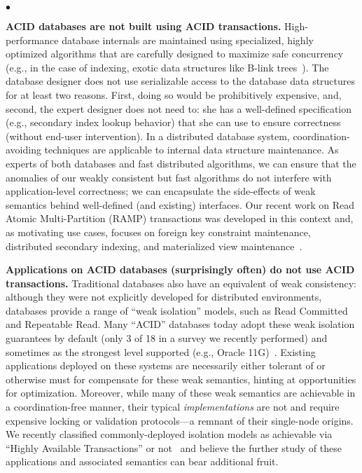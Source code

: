 \documentclass[9pt]{article}
\theoremstyle{definition}
\theoremstyle{remark}
\newenvironment{myitemize}
{
  \vspace{-.5em}
    \begin{list}{$\bullet$ }{}
        \setlength{\topsep}{0em}
        \setlength{\parskip}{0pt}
        \setlength{\partopsep}{0pt}
        \setlength{\parsep}{0pt}         
        \setlength{\itemsep}{.4em} 
        \setlength{\itemindent}{0em}
}
{
    \end{list} 
    \vspace{-.5em}
}
\begin{document}
\begin{myitemize}
\item \textbf{ACID databases are not built using ACID transactions.} High-performance database internals are maintained using specialized, highly optimized algorithms that are carefully designed to maximize safe concurrency~\cite{gray-book} (e.g., in the case of indexing, exotic data structures like B-link trees~\cite{blink-tree}). The database designer does not use serializable access to the database data structures for at least two reasons. First, doing so would be prohibitively expensive, and, second, the expert designer does not need to: she has a well-defined specification (e.g., secondary index lookup behavior) that she can use to ensure correctness (without end-user intervention). In a distributed database system, coordination-avoiding techniques are applicable to internal data structure maintenance. As experts of both databases and fast distributed algorithms, we can ensure that the anomalies of our weakly consistent but fast algorithms do not interfere with application-level correctness; we can encapsulate the side-effects of weak semantics behind well-defined (and existing) interfaces. Our recent work on Read Atomic Multi-Partition (RAMP) transactions was developed in this context and, as motivating use cases, focuses on foreign key constraint maintenance, distributed secondary indexing, and materialized view maintenance~\cite{ramp-txns}.

\item \textbf{Applications on ACID databases (surprisingly often) do not use ACID transactions.} Traditional databases also have an equivalent of weak consistency: although they were not explicitly developed for distributed environments, databases provide a range of ``weak isolation'' models, such as Read Committed and Repeatable Read. Many ``ACID'' databases today adopt these weak isolation guarantees by default (only 3 of 18 in a survey we recently performed) and sometimes as the strongest level supported (e.g., Oracle 11G)~\cite{hat-vldb}. Existing applications deployed on these systems are necessarily either tolerant of or otherwise must for compensate for these weak semantics, hinting at opportunities for optimization. Moreover, while many of these weak semantics are achievable in a coordination-free manner, their typical \textit{implementations} are not and require expensive locking or validation protocols---a remnant of their single-node origins. We recently classified commonly-deployed isolation models as achievable via ``Highly Available Transactions'' or not~\cite{hat-vldb} and believe the further study of these applications and associated semantics can bear additional fruit.


\end{myitemize}
\end{document}
